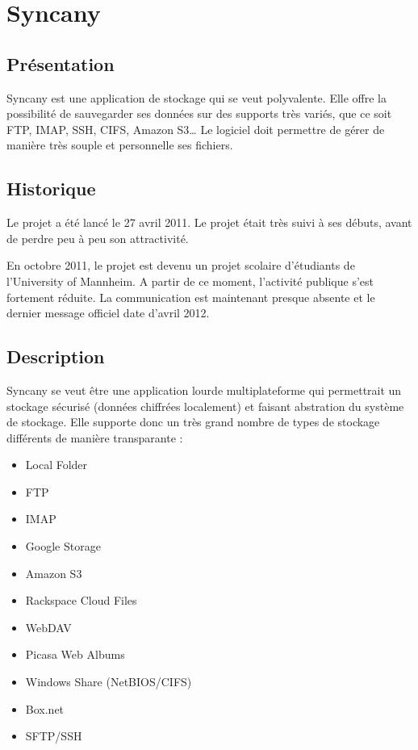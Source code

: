 \chapter{Syncany}
\thispagestyle{EIP} %
\section{Présentation}
Syncany est une application de stockage qui se veut polyvalente. Elle offre la possibilité de sauvegarder ses données sur des supports très variés, que ce soit FTP, IMAP, SSH, CIFS, Amazon S3… Le logiciel doit permettre de gérer de manière très souple et personnelle ses fichiers.

\section{Historique}
Le projet a été lancé le 27 avril 2011. Le projet était très suivi à ses débuts, avant de perdre peu à peu son attractivité. 

En octobre 2011, le projet est devenu un projet scolaire d'étudiants de l'University of Mannheim. A partir de ce moment, l'activité publique s'est fortement réduite. La communication est maintenant presque absente et le dernier message officiel date d'avril 2012.

\section{Description}
Syncany se veut être une application lourde multiplateforme qui permettrait un stockage sécurisé (données chiffrées localement) et faisant abstration du système de stockage. Elle supporte donc un très grand nombre de types de stockage différents de manière transparante :

\begin{itemize}
\renewcommand{\labelitemi}{$\bullet$}
\item Local Folder
\item FTP
\item IMAP
\item Google Storage
\item Amazon S3
\item Rackspace Cloud Files
\item WebDAV
\item Picasa Web Albums
\item Windows Share (NetBIOS/CIFS)
\item Box.net
\item SFTP/SSH
\end{itemize}

